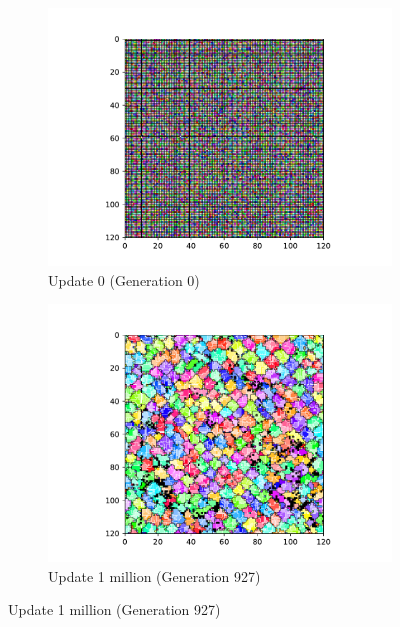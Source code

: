 \begin{figure}[!htbp]
\begin{center}
\begin{subfigure}[b]{0.5\columnwidth}
  \includegraphics[width=\columnwidth,trim={2.5cm 0.5cm 2.5cm 1cm},clip]{img/ChannelMap_1011_update0}
  \caption{Update 0 (Generation 0)}
  \label{fig:ChannelMap_1011_update0}
\end{subfigure}%
\begin{subfigure}[b]{0.5\columnwidth}
  \includegraphics[width=\columnwidth,trim={2.5cm 0.5cm 2.5cm 1cm},clip]{img/ChannelMap_1011_update1000000}
  \caption{Update 1 million (Generation 927)}
  \label{fig:ChannelMap_1011_update1000000}
\end{subfigure}

\end{center}
\end{figure}
